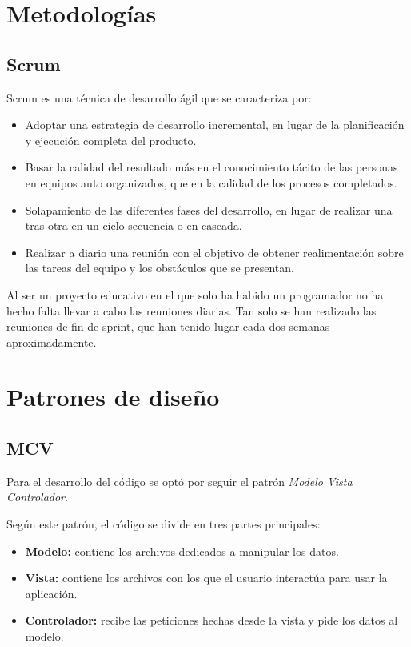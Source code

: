 
\section{Metodologías}\label{metodologias}
\subsection{Scrum}\label{scrum}
Scrum es una técnica de desarrollo ágil que se caracteriza por: \cite{wiki:Scrum_(desarrollo_de_software)}
\begin{itemize}
\tightlist
\item Adoptar una estrategia de desarrollo incremental, en lugar de la planificación y ejecución completa del producto.
\item Basar la calidad del resultado más en el conocimiento tácito de las personas en equipos auto organizados, que en la calidad de los procesos completados.
\item Solapamiento de las diferentes fases del desarrollo, en lugar de realizar una tras otra en un ciclo secuencia o en cascada.
\item Realizar a diario una reunión con el objetivo de obtener realimentación sobre las tareas del equipo y los obstáculos que se presentan.
\end{itemize}
Al ser un proyecto educativo en el que solo ha habido un programador no ha hecho falta llevar a cabo las reuniones diarias. Tan solo se han realizado las reuniones de fin de sprint, que han tenido lugar cada dos semanas aproximadamente.

\section{Patrones de diseño}\label{patrones-diseno}
\subsection{MCV}\label{mvc}
Para el desarrollo del código se optó por seguir el patrón \textit{Modelo Vista Controlador}.

Según este patrón, el código se divide en tres partes principales:
\begin{itemize}
\tightlist
\item \textbf{Modelo:} contiene los archivos dedicados a manipular los datos.
\item \textbf{Vista:} contiene los archivos con los que el usuario interactúa para usar la aplicación.
\item \textbf{Controlador:} recibe las peticiones hechas desde la vista y pide los datos al modelo.
\end{itemize}

